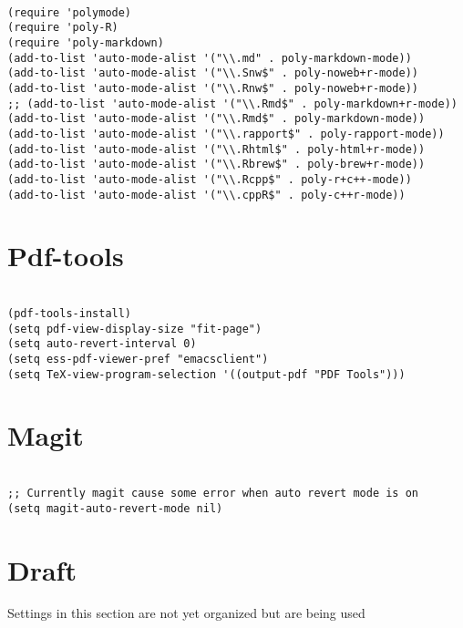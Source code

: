 \documentclass[11pt]{article}
\begin{document}
\begin{verbatim}

(require 'polymode)
(require 'poly-R)
(require 'poly-markdown)
(add-to-list 'auto-mode-alist '("\\.md" . poly-markdown-mode))
(add-to-list 'auto-mode-alist '("\\.Snw$" . poly-noweb+r-mode))
(add-to-list 'auto-mode-alist '("\\.Rnw$" . poly-noweb+r-mode))
;; (add-to-list 'auto-mode-alist '("\\.Rmd$" . poly-markdown+r-mode))
(add-to-list 'auto-mode-alist '("\\.Rmd$" . poly-markdown-mode))
(add-to-list 'auto-mode-alist '("\\.rapport$" . poly-rapport-mode))
(add-to-list 'auto-mode-alist '("\\.Rhtml$" . poly-html+r-mode))
(add-to-list 'auto-mode-alist '("\\.Rbrew$" . poly-brew+r-mode))
(add-to-list 'auto-mode-alist '("\\.Rcpp$" . poly-r+c++-mode))
(add-to-list 'auto-mode-alist '("\\.cppR$" . poly-c++r-mode))

\end{verbatim}

\section{Pdf-tools}
\label{sec:org81f5ecc}

\begin{verbatim}

(pdf-tools-install)
(setq pdf-view-display-size "fit-page")
(setq auto-revert-interval 0)
(setq ess-pdf-viewer-pref "emacsclient")
(setq TeX-view-program-selection '((output-pdf "PDF Tools")))

\end{verbatim}

\section{Magit}
\label{sec:orgf3e9e5d}

\begin{verbatim}

;; Currently magit cause some error when auto revert mode is on
(setq magit-auto-revert-mode nil)

\end{verbatim}

\section{Draft}
\label{sec:org7862d04}
Settings in this section are not yet organized but are being used
\end{document}
